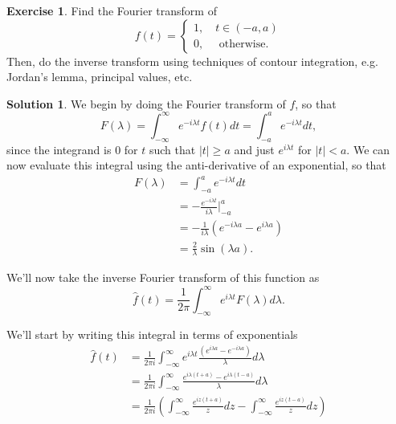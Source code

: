 \documentclass[12pt]{article}
\newcommand{\abs}[1]{ \left| #1 \right| }
\theoremstyle{definition}
\newtheorem{exer}{Exercise}
\newtheorem{sol}{Solution}
\theoremstyle{remark}
\begin{document}
\newpage

\begin{exer}
    Find the Fourier transform of 
    \begin{equation}
        f(t) = \begin{cases}
            1, \quad t\in(-a,a)\\
            0, \quad \text{ otherwise}.
        \end{cases}
    \end{equation}
    Then, do the inverse transform using techniques of contour integration, e.g. Jordan's lemma, principal values, etc.
\end{exer}

\begin{sol}
    We begin by doing the Fourier transform of $f$, so that
    \begin{equation}
        F(\lambda) = \int_{-\infty}^{\infty} e^{-i\lambda t} f(t) dt = \int_{-a}^{a} e^{-i\lambda t}dt,
    \end{equation}
    since the integrand is 0 for $t$ such that $\abs{t} \geq a$ and just $e^{i\lambda t}$ for $\abs{t}<a$. We can now evaluate this integral using the anti-derivative of an exponential, so that
    \begin{align}
        F(\lambda) &= \int_{-a}^{a} e^{-i\lambda t}dt\\
                   &= -\frac{e^{-i\lambda t}}{i\lambda} \vert_{-a}^{a}\\
                   &= -\frac{1}{i\lambda} \left(e^{-i\lambda a} - e^{i\lambda a} \right ) \\
                   &= \frac{2}{\lambda}\sin(\lambda a). 
    \end{align}

    We'll now take the inverse Fourier transform of this function as 
    \begin{equation}
        \hat f(t) = \frac{1}{2\pi} \int_{-\infty}^{\infty} e^{i\lambda t} F(\lambda) d\lambda. 
    \end{equation}

    We'll start by writing this integral in terms of exponentials 
    \begin{align}
        \hat f(t) &= \frac{1}{2\pi i}  \int_{-\infty}^{\infty} e^{i\lambda t} \frac{(e^{i\lambda a} - e^{-i\lambda a} )}{\lambda} d\lambda\\
                  &= \frac{1}{2\pi i}  \int_{-\infty}^{\infty} \frac{e^{i\lambda (t+a)} - e^{i\lambda (t - a)}}{\lambda} d\lambda \\
                  &= 
                  \frac{1}{2\pi i} \left( \int_{-\infty}^{\infty} \frac{e^{i z (t+a)}}{z} dz -  \int_{-\infty}^{\infty} \frac{e^{iz (t-a)}}{z} dz \right)  \\
    \end{align}


\end{sol}
\end{document}
